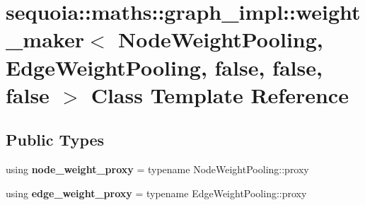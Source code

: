 \hypertarget{classsequoia_1_1maths_1_1graph__impl_1_1weight__maker_3_01_node_weight_pooling_00_01_edge_weight51eeaf74d246223c8fe9e272909992cd}{}\section{sequoia\+::maths\+::graph\+\_\+impl\+::weight\+\_\+maker$<$ Node\+Weight\+Pooling, Edge\+Weight\+Pooling, false, false, false $>$ Class Template Reference}
\label{classsequoia_1_1maths_1_1graph__impl_1_1weight__maker_3_01_node_weight_pooling_00_01_edge_weight51eeaf74d246223c8fe9e272909992cd}
\subsection*{Public Types}
\begin{DoxyCompactItemize}
\item 
\mbox{\label{classsequoia_1_1maths_1_1graph__impl_1_1weight__maker_3_01_node_weight_pooling_00_01_edge_weight51eeaf74d246223c8fe9e272909992cd_a988bc429eaeaf34ed1b9f2cc8350314a}} 
using {\bfseries node\+\_\+weight\+\_\+proxy} = typename Node\+Weight\+Pooling\+::proxy
\item 
\mbox{\label{classsequoia_1_1maths_1_1graph__impl_1_1weight__maker_3_01_node_weight_pooling_00_01_edge_weight51eeaf74d246223c8fe9e272909992cd_a7d2853c69a3d7e879e9486391566b989}} 
using {\bfseries edge\+\_\+weight\+\_\+proxy} = typename Edge\+Weight\+Pooling\+::proxy
\end{DoxyCompactItemize}
